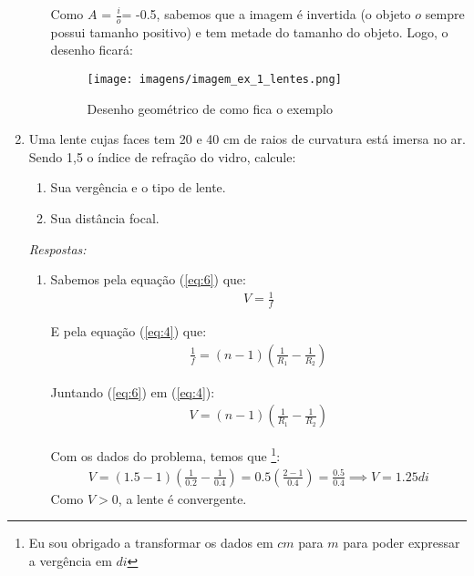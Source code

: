 \documentclass[12pt]{extarticle}
\newcommand{\<}{\langle}
\renewcommand{\>}{\rangle}
\theoremstyle{definition}
\begin{document}
\begin{enumerate}
\begin{enumerate}
        Como $A$ = $\frac{i}{o}$= -0.5, sabemos que a imagem é invertida (o objeto $o$ sempre possui tamanho positivo) e tem metade do tamanho do objeto. Logo, o desenho ficará:
        
        \begin{figure} [H]
            \centering
            \texttt{[image: imagens/imagem\_ex\_1\_lentes.png]}
            \caption{Desenho geométrico de como fica o exemplo}
            \label{fig:ex1}
        \end{figure}
    \end{enumerate}

    \item
    Uma lente cujas faces tem 20 e 40 cm de raios de curvatura está imersa no ar. Sendo 1,5 o índice de refração do vidro, calcule:
    \begin{enumerate}
        \item 
        Sua vergência e o tipo de lente.
        \item
        Sua distância focal.
    \end{enumerate}
    
    \textit{Respostas:}
    \begin{enumerate}
    
        \item 
        
        Sabemos pela equação (\ref{eq:6}) que: 
        \begin{align*}
            V=\frac{1}{f}
        \end{align*}
        
        E pela equação (\ref{eq:4}) que: 
        \begin{align*}
            \frac{1}{f} = (n-1)(\frac{1}{R_{1}} - \frac{1}{R_{2}})
        \end{align*}
        
        Juntando (\ref{eq:6}) em (\ref{eq:4}):
        \begin{align*}
            V = (n-1)(\frac{1}{R_{1}} - \frac{1}{R_{2}})
        \end{align*}
        
        Com os dados do problema, temos que \footnote{Eu sou obrigado a transformar os dados em $cm$ para $m$ para poder expressar a vergência em $di$}:
        \begin{align*}
            V = (1.5-1)(\frac{1}{0.2} - \frac{1}{0.4}) = 0.5(\frac{2-1}{0.4}) = \frac{0.5}{0.4} \implies V = 1.25 di
        \end{align*}
        Como $V>0$, a lente é convergente.
        

\end{enumerate}
\end{enumerate}
\end{document}

